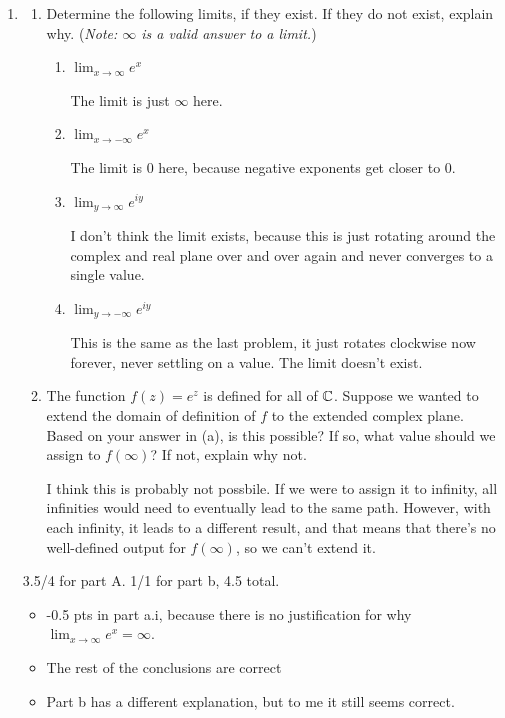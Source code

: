 \begin{enumerate}
\item \begin{enumerate}
	\item Determine the following limits, if they exist. If they do not exist, explain why. ({\it Note: $\infty$ is a valid answer to a limit.})
		\begin{enumerate}
		\item $\lim_{x\to \infty} e^x$
			\begin{problem}
				The limit is just $\infty$ here. 
			\end{problem}
		\item $\lim_{x\to -\infty} e^x$
			\begin{problem}
				The limit is 0 here, because negative exponents get closer to 0. 
			\end{problem}
		\item $\lim_{y\to \infty} e^{iy}$
			\begin{problem}
				I don't think the limit exists, because this is just rotating around the complex and real plane over and over again and never converges to a single value. 
			\end{problem}
		\item $\lim_{y\to -\infty} e^{iy}$
		\begin{problem}
			This is the same as the last problem, it just rotates clockwise now forever, never settling on a value. The limit doesn't exist. 
		\end{problem}
		\end{enumerate}
	\pagebreak
	\item The function $f(z) = e^z$ is defined for all of $\mathbb{C}$. Suppose we wanted to extend the domain of definition of $f$ to the extended complex plane. Based on your answer in (a), is this possible? If so, what value should we assign to $f(\infty)$? If not, explain why not.
	\begin{problem}
		I think this is probably not possbile. If we were to assign it to infinity, all infinities would need to eventually lead to the same path. However, with each infinity, it leads to a different result, and that means that there's no well-defined output for $f(\infty)$, so we can't extend it. 
	\end{problem}
	\end{enumerate}
	\begin{grade}
		3.5/4 for part A. 1/1 for part b, 4.5 total.
		\begin{itemize}[itemsep=0pt, parsep=0pt]
			\item -0.5 pts in part a.i, because there is no justification for why $\lim_{x\to\infty}e^x = \infty$.
			\item The rest of the conclusions are correct
			\item Part b has a different explanation, but to me it still seems correct. 
		\end{itemize}
	\end{grade}
\end{enumerate}



